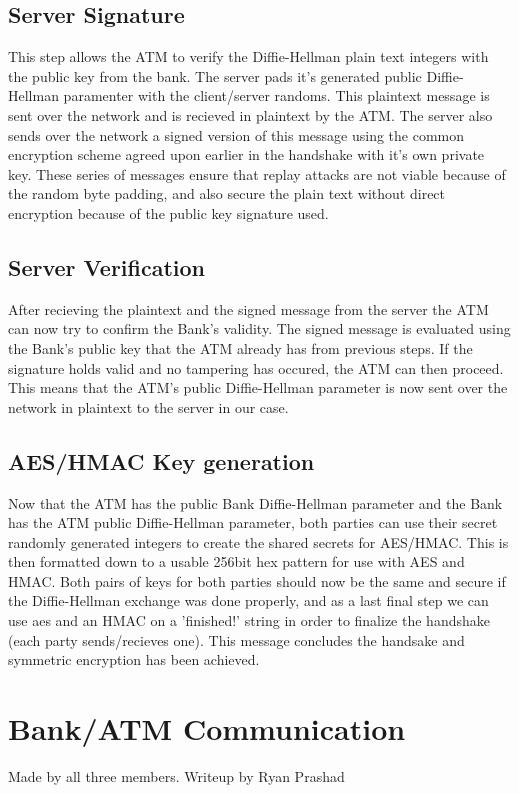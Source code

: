 \documentclass{article}
\begin{document}
	\subsection{Server Signature}\label{sec:servsig}
		This step allows the ATM to verify the Diffie-Hellman plain text integers with the public key from the bank. The server pads it's generated public Diffie-Hellman
		paramenter with the client/server randoms. This plaintext message is sent over the network and is recieved in plaintext by the ATM. The server also sends over the network a signed version of this message using the common encryption scheme agreed upon earlier in the handshake with it's own private key. These series of messages ensure that replay attacks are not viable because of the random byte padding, and also secure the plain text without direct encryption because of the public key signature used.
		
	\subsection{Server Verification}\label{sec:servconf}
		After recieving the plaintext and the signed message from the server the ATM can now try to confirm the Bank's validity. The signed message is evaluated using the Bank's public key that the ATM already has from previous steps. If the signature holds valid and no tampering has occured, the ATM can then proceed. This means that the ATM's public Diffie-Hellman parameter is now sent over the network in plaintext to the server in our case.
	
	\subsection{AES/HMAC Key generation}\label{sec:keygen}
		Now that the ATM has the public Bank Diffie-Hellman parameter and the Bank has the ATM public Diffie-Hellman parameter, both parties can use their secret randomly generated integers to create the shared secrets for AES/HMAC. This is then formatted down to a usable 256bit hex pattern for use with AES and HMAC. Both pairs of keys for both  parties should now be the same and secure if the Diffie-Hellman exchange was done properly, and as a last final step we can use aes and an HMAC on a 'finished!' string in order to finalize the handshake (each party sends/recieves one). This message concludes the handsake and symmetric encryption has been achieved.

\section{Bank/ATM Communication}\label{sec:batmcoms}
Made by all three members. Writeup by Ryan Prashad\\
\end{document}

